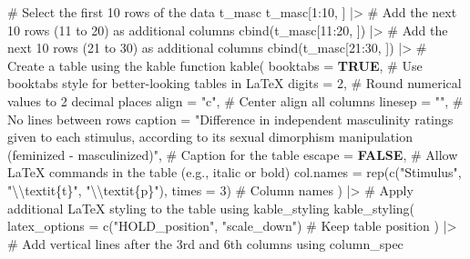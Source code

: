 \documentclass[
  bookmarksnumbered]{article}
\newenvironment{Shaded}{\begin{snugshade}}{\end{snugshade}}
\newcommand{\AttributeTok}[1]{\textcolor[rgb]{0.80,0.80,0.80}{#1}}
\newcommand{\CommentTok}[1]{\textcolor[rgb]{0.50,0.62,0.50}{#1}}
\newcommand{\ConstantTok}[1]{\textcolor[rgb]{0.86,0.64,0.64}{\textbf{#1}}}
\newcommand{\DecValTok}[1]{\textcolor[rgb]{0.86,0.86,0.80}{#1}}
\newcommand{\FunctionTok}[1]{\textcolor[rgb]{0.94,0.94,0.56}{#1}}
\newcommand{\NormalTok}[1]{\textcolor[rgb]{0.80,0.80,0.80}{#1}}
\newcommand{\SpecialCharTok}[1]{\textcolor[rgb]{0.86,0.64,0.64}{#1}}
\newcommand{\StringTok}[1]{\textcolor[rgb]{0.80,0.58,0.58}{#1}}
\begin{document}
\begin{Shaded}
\begin{Highlighting}[]
\CommentTok{\# Select the first 10 rows of the data \textquotesingle{}t\_masc\textquotesingle{}}
\NormalTok{t\_masc[}\DecValTok{1}\SpecialCharTok{:}\DecValTok{10}\NormalTok{, ] }\SpecialCharTok{|\textgreater{}}
  \CommentTok{\# Add the next 10 rows (11 to 20) as additional columns}
  \FunctionTok{cbind}\NormalTok{(t\_masc[}\DecValTok{11}\SpecialCharTok{:}\DecValTok{20}\NormalTok{, ]) }\SpecialCharTok{|\textgreater{}}
  \CommentTok{\# Add the next 10 rows (21 to 30) as additional columns}
  \FunctionTok{cbind}\NormalTok{(t\_masc[}\DecValTok{21}\SpecialCharTok{:}\DecValTok{30}\NormalTok{, ]) }\SpecialCharTok{|\textgreater{}}
  \CommentTok{\# Create a table using the \textquotesingle{}kable\textquotesingle{} function}
  \FunctionTok{kable}\NormalTok{(}
    \AttributeTok{booktabs =} \ConstantTok{TRUE}\NormalTok{, }\CommentTok{\# Use \textquotesingle{}booktabs\textquotesingle{} style for better{-}looking tables in LaTeX}
    \AttributeTok{digits =} \DecValTok{2}\NormalTok{, }\CommentTok{\# Round numerical values to 2 decimal places}
    \AttributeTok{align =} \StringTok{"c"}\NormalTok{, }\CommentTok{\# Center align all columns}
    \AttributeTok{linesep =} \StringTok{""}\NormalTok{, }\CommentTok{\# No lines between rows}
    \AttributeTok{caption =} \StringTok{"Difference in independent masculinity ratings given to each stimulus,}
\StringTok{               according to its sexual dimorphism manipulation (feminized {-} masculinized)"}\NormalTok{,}
    \CommentTok{\# Caption for the table}
    \AttributeTok{escape =} \ConstantTok{FALSE}\NormalTok{, }\CommentTok{\# Allow LaTeX commands in the table (e.g., italic or bold)}
    \AttributeTok{col.names =} \FunctionTok{rep}\NormalTok{(}\FunctionTok{c}\NormalTok{(}\StringTok{"Stimulus"}\NormalTok{, }\StringTok{"}\SpecialCharTok{\textbackslash{}\textbackslash{}}\StringTok{textit\{t\}"}\NormalTok{, }\StringTok{"}\SpecialCharTok{\textbackslash{}\textbackslash{}}\StringTok{textit\{p\}"}\NormalTok{), }\AttributeTok{times =} \DecValTok{3}\NormalTok{) }\CommentTok{\# Column names}
\NormalTok{  ) }\SpecialCharTok{|\textgreater{}}
  \CommentTok{\# Apply additional LaTeX styling to the table using \textquotesingle{}kable\_styling\textquotesingle{}}
  \FunctionTok{kable\_styling}\NormalTok{(}
    \AttributeTok{latex\_options =} \FunctionTok{c}\NormalTok{(}\StringTok{"HOLD\_position"}\NormalTok{, }\StringTok{"scale\_down"}\NormalTok{) }\CommentTok{\# Keep table position}
\NormalTok{  ) }\SpecialCharTok{|\textgreater{}}
  \CommentTok{\# Add vertical lines after the 3rd and 6th columns using \textquotesingle{}column\_spec\textquotesingle{}}

\end{Highlighting}
\end{Shaded}
\end{document}
